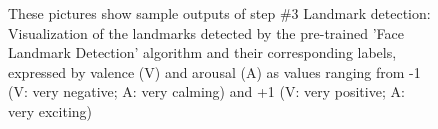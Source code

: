 \begin{figure}[htbp]
  \hfill
  \caption[ER pipeline step \#3: Landmark detection]{These pictures show sample outputs of step \#3 Landmark detection: Visualization of the landmarks detected by the pre-trained 'Face Landmark Detection' algorithm \citep{Kazemi:2014:ShapePredictor} and their corresponding labels, expressed by valence (V) and arousal (A) as values ranging from -1 (V: very negative; A: very calming) and +1 (V: very positive; A: very exciting)}
  \label{fig:MethodologyLandmarks}
\end{figure}

